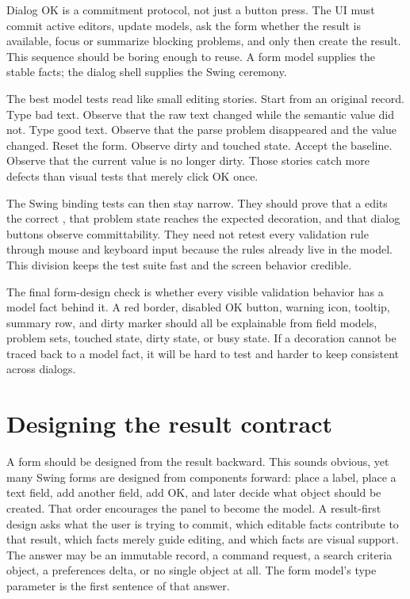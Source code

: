 Dialog OK is a commitment protocol, not just a button press. The UI must commit
active editors, update models, ask the form whether the result is available,
focus or summarize blocking problems, and only then create the result. This
sequence should be boring enough to reuse. A form model supplies the stable
facts; the dialog shell supplies the Swing ceremony.

The best model tests read like small editing stories. Start from an original
record. Type bad text. Observe that the raw text changed while the semantic
value did not. Type good text. Observe that the parse problem disappeared and
the value changed. Reset the form. Observe dirty and touched state. Accept the
baseline. Observe that the current value is no longer dirty. Those stories catch
more defects than visual tests that merely click OK once.

The Swing binding tests can then stay narrow. They should prove that a
 edits the correct , that problem state
reaches the expected decoration, and that dialog buttons observe
committability. They need not retest every validation rule through mouse and
keyboard input because the rules already live in the model. This division keeps
the test suite fast and the screen behavior credible.

The final form-design check is whether every visible validation behavior has a
model fact behind it. A red border, disabled OK button, warning icon, tooltip,
summary row, and dirty marker should all be explainable from field models,
problem sets, touched state, dirty state, or busy state. If a decoration cannot
be traced back to a model fact, it will be hard to test and harder to keep
consistent across dialogs.

\section{Designing the result contract}

A form should be designed from the result backward. This sounds obvious, yet
many Swing forms are designed from components forward: place a label, place a
text field, add another field, add OK, and later decide what object should be
created. That order encourages the panel to become the model. A result-first
design asks what the user is trying to commit, which editable facts contribute
to that result, which facts merely guide editing, and which facts are visual
support. The answer may be an immutable record, a command request, a search
criteria object, a preferences delta, or no single object at all. The form
model's type parameter is the first sentence of that answer.

